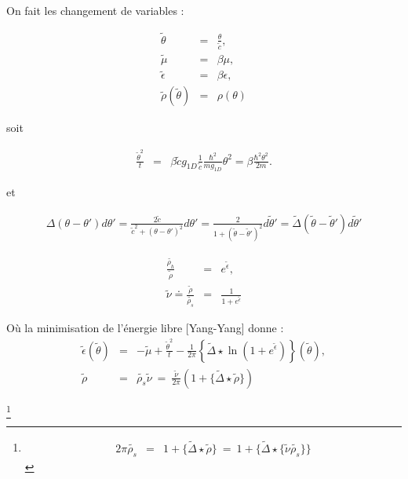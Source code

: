 On fait les changement de variables :

\begin{eqnarray*}
	\tilde{\theta} & = & \frac{\theta}{\tilde {c}},\\
	\tilde{\mu} & =& \beta \mu ,\\
	\tilde{\epsilon} & = & \beta \epsilon , \\
	\tilde{\rho}(\tilde{\theta}) & = & \rho ( \theta ) 	
\end{eqnarray*}

soit 

\begin{eqnarray*}
	\frac{\tilde{\theta}^2}{t}	 & = & \beta \tilde{c} g_{1D} \frac{1}{\tilde{c}} \frac{\hbar^2}{m g_{1D}} \theta^2 = \beta \frac{ \hbar^2 \theta^2}{2 m}.
\end{eqnarray*}

et 

\begin{eqnarray*}
	\Delta ( \theta - \theta' ) d\theta' = \frac{2 \tilde{c}}{ \tilde{c}^2 + ( \theta - \theta')^2 } d \theta' = \frac{2}{ 1 + ( \tilde{\theta} - \tilde{\theta}')^2 } d\tilde{\theta}' = \tilde{\Delta} ( \tilde{\theta} - \tilde{\theta}') d \tilde{\theta}' 	
\end{eqnarray*}

\begin{eqnarray}
	\frac{\tilde{\rho_h}}{\tilde{\rho}} & = & e^{\tilde{\epsilon} }, \\
	\tilde{\nu} \doteq \frac{\tilde{\rho}}{\tilde{\rho_s}} & = & \frac{1}{1+ e ^{\tilde{\epsilon}} }	
\end{eqnarray}

Où la minimisation de l'énergie libre [Yang-Yang] donne :
\begin{eqnarray}
	\tilde{\epsilon} ( \tilde{\theta} ) & = & - \tilde{\mu} + \frac{\tilde{\theta}^2 }{t} - \frac{1}{2 \pi} \left \{\tilde{\Delta} \star \ln \left ( 1 + e^{\tilde{\epsilon}} \right )  \right \} ( \tilde{\theta} ), \label{eq:1Bess}\\
	\tilde{\rho} &=& \tilde{\rho_s} \tilde{\nu}   ~=~   \frac{\tilde{\nu}}{2 \pi}  ( 1 + \{ \tilde{\Delta} \star \tilde{\rho} \} ) 	 \label{eq:2Bess}
\end{eqnarray}

\footnote{\begin{eqnarray} 2\pi \tilde{\rho_s}  & =  &  1 + \{ \tilde{\Delta} \star \tilde{\rho} \} ~= ~ 1 + \{ \tilde{\Delta} \star \{\tilde{\nu} \tilde{\rho_s}\} \}  \label{eq:3Bess}\end{eqnarray}}

